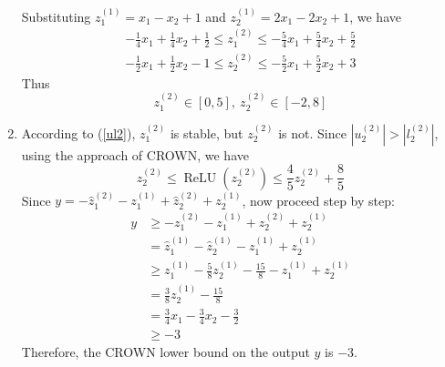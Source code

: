 \documentclass[12pt]{article}
\newcommand{\var}[3]{#1_{#2}^{(#3)}}
\newcommand{\relu}[1]{\operatorname{ReLU}\left(#1\right)}
\begin{document}
\begin{enumerate}[1.]
	Substituting $\var{z}{1}{1} = x_{1} - x_{2} + 1$ and $\var{z}{2}{1} = 2 x_{1} - 2 x_{2} + 1$, we have
	\begin{equation}
	\begin{gathered}
		-\frac{1}{4} x_{1} + \frac{1}{4} x_{2} + \frac{1}{2} \leqslant \var{z}{1}{2} \leqslant -\frac{5}{4} x_{1} +  \frac{5}{4} x_{2} + \frac{5}{2}\\
		-\frac{1}{2} x_{1} + \frac{1}{2} x_{2} - 1 \leqslant \var{z}{2}{2} \leqslant -\frac{5}{2} x_{1} + \frac{5}{2} x_{2} + 3
	\end{gathered}
	\end{equation}
	Thus
	\begin{equation}
		\label{ul2}
		\var{z}{1}{2} \in \left[0, 5\right], \ \var{z}{2}{2} \in \left[-2, 8\right]
	\end{equation}
	
\item According to (\ref{ul2}), $\var{z}{1}{2}$ is stable, but $\var{z}{2}{2}$ is not. Since $|\var{u}{2}{2}| > |\var{l}{2}{2}| $, using the approach of CROWN, we have
	\begin{equation}
		\var{z}{2}{2} \leqslant \relu{\var{z}{2}{2}} \leqslant \frac{4}{5} \var{z}{2}{2} + \frac{8}{5}
	\end{equation}
	Since $y = -\var{\hat{z}}{1}{2} - \var{z}{1}{1} + \var{\hat{z}}{2}{2} + \var{z}{2}{1}$, now proceed step by step:
	\begin{equation}
	\begin{aligned}
		y & \geqslant -\var{z}{1}{2} - \var{z}{1}{1} + \var{z}{2}{2} + \var{z}{2}{1}\\
		& = \var{\hat{z}}{1}{1} - \var{\hat{z}}{2}{1} - \var{z}{1}{1} + \var{z}{2}{1}\\
		& \geqslant \var{z}{1}{1} - \frac{5}{8} \var{z}{2}{1} - \frac{15}{8} - \var{z}{1}{1} + \var{z}{2}{1}\\
		& = \frac{3}{8} \var{z}{2}{1} - \frac{15}{8}\\
		& = \frac{3}{4} x_{1} - \frac{3}{4} x_{2} - \frac{3}{2}\\
		& \geqslant -3
	\end{aligned}
	\end{equation}
	Therefore, the CROWN lower bound on the output $y$ is $-3$.
	

\end{enumerate}
\end{document}
